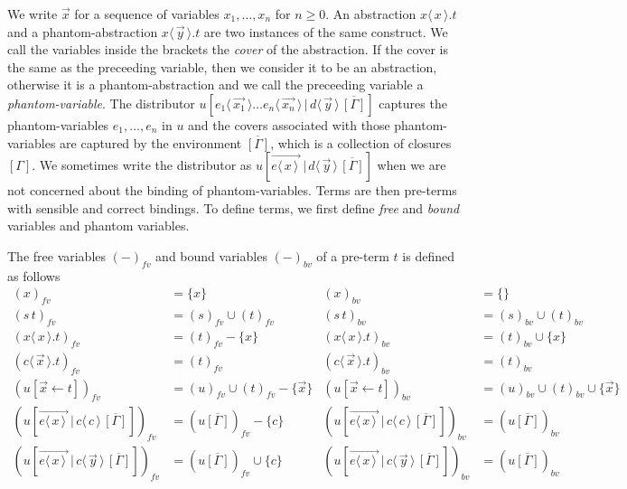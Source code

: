 \documentclass[a4paper,UKenglish,cleveref, autoref]{lipics-v2019}
\newcommand{\fv}[1]{(#1)_{fv}}
\newcommand{\bv}[1]{(#1)_{bv}}
\newcommand{\set}[1]{ \{ #1 \} }
\newcommand{\app}[2]{#1 \, #2}
\newcommand{\fake}[3]{#1 \langle \, #2 \, \rangle . #3}
\newcommand{\share}[3]{#1 [#2 \leftarrow #3]}
\newcommand{\dist}[5]{#1 [ #2 \, \vert \, \fakedist{#4}{#5} \, #3 ]}
\newcommand{\fakedist}[2]{#1 \langle \, #2 \, \rangle}
\newcommand{\vecdist}[2]{\overrightarrow{\fakedist{#1}{#2} \,}}
\begin{document}
We write $\vec{x}$ for a sequence of variables $x_{1}, \dots, x_{n}$ for $n \geq 0$. An abstraction $\fake{x}{x}{t}$ and a phantom-abstraction $\fake{x}{\vec{y}}{t}$ are two instances of the same construct. We call the variables inside the brackets the \emph{cover} of the abstraction. If the cover is the same as the preceeding variable, then we consider it to be an abstraction, otherwise it is a phantom-abstraction and we call the preceeding variable a \emph{phantom-variable}. The distributor  $\dist{u}{\fakedist{e_{1}}{\vec{x_{1}}} \dots \fakedist{e_{n}}{\vec{x_{n}}}}{\overline{[\Gamma]}}{d}{\vec{y}}$ captures the phantom-variables $e_{1}, \dots, e_{n}$ in $u$ and the covers associated with those phantom-variables are captured by the environment $\overline{[\Gamma]}$, which is a collection of closures $[\Gamma]$. We sometimes write the distributor as $\dist{u}{\vecdist{e}{x}}{\overline{[\Gamma]}}{d}{\vec{y}}$ when we are not concerned about the binding of phantom-variables. Terms are then pre-terms with sensible and correct bindings. To define terms, we first define \emph{free} and \emph{bound} variables and phantom variables.

\begin{definition} 
\label{def:freeboundvar} The free variables $\fv{-}$ and bound variables $\bv{-}$ of a pre-term $t$ is defined as follows
	\begin{align*}
		\fv{x} &= \set{x} & \bv{x} &= \set{} \\
		\fv{\app{s}{t}} &= \fv{s} \cup \fv{t} & \bv{\app{s}{t}} &= \bv{s} \cup \bv{t} \\
		\fv{\fake{x}{x}{t}} &= \fv{t} - \set{x} & \bv{\fake{x}{x}{t}} &= \bv{t} \cup \set{x} \\
		\fv{\fake{c}{\vec{x}}{t}} &= \fv{t} & \bv{\fake{c}{\vec{x}}{t}} &= \bv{t} \\
		\fv{\share{u}{\vec{x}}{t}} &= \fv{u} \cup \fv{t} - \set{\vec{x}} & \bv{\share{u}{\vec{x}}{t}} &= \bv{u} \cup \bv{t} \cup \set{\vec{x}}  \\
		\fv{\dist{u}{\vecdist{e}{x}}{\overline{[\Gamma]}}{c}{c}} &= \fv{u \overline{[\Gamma]}} - \set{c} & \bv{\dist{u}{\vecdist{e}{x}}{\overline{[\Gamma]}}{c}{c}} &= \bv{u \overline{[\Gamma]}} \\
		\fv{\dist{u}{\vecdist{e}{x}}{\overline{[\Gamma]}}{c}{\vec{y}}} &= \fv{u \overline{[\Gamma]}} \cup \set{c} & \bv{\dist{u}{\vecdist{e}{x}}{\overline{[\Gamma]}}{c}{\vec{y}}} &= \bv{u \overline{[\Gamma]}} \\
	\end{align*}
\end{definition}
\end{document}
